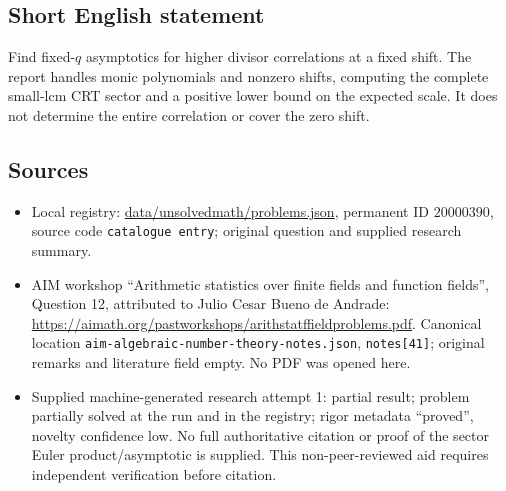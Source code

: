\documentclass[11pt]{article}
\begin{document}
\subsection{Short English statement}
Find fixed-$q$ asymptotics for higher divisor correlations at a fixed shift. The report handles monic polynomials and nonzero shifts, computing the complete small-lcm CRT sector and a positive lower bound on the expected scale. It does not determine the entire correlation or cover the zero shift.
\subsection{Sources}
\begin{itemize}
\item Local registry: \url{data/unsolvedmath/problems.json}, permanent ID $20000390$, source code \texttt{catalogue entry}; original question and supplied research summary.
\item AIM workshop ``Arithmetic statistics over finite fields and function fields'', Question 12, attributed to Julio Cesar Bueno de Andrade: \url{https://aimath.org/pastworkshops/arithstatffieldproblems.pdf}. Canonical location \texttt{aim-algebraic-number-theory-notes.json}, \texttt{notes[41]}; original remarks and literature field empty. No PDF was opened here.
\item Supplied machine-generated research attempt 1: partial result; problem partially solved at the run and in the registry; rigor metadata ``proved'', novelty confidence low. No full authoritative citation or proof of the sector Euler product/asymptotic is supplied. This non-peer-reviewed aid requires independent verification before citation.
\end{itemize}
\end{document}
